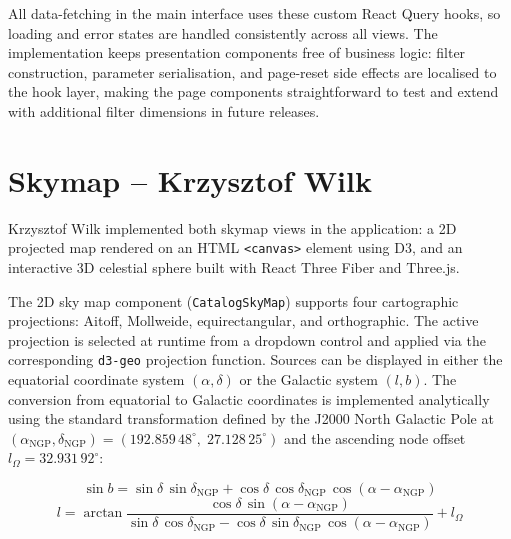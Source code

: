 \documentclass[11pt, a4paper]{article}
\begin{document}
All data-fetching in the main interface uses these custom React Query hooks, so loading and error states are handled consistently across all views.
The implementation keeps presentation components free of business logic: filter construction, parameter serialisation, and page-reset side effects are localised to the hook layer, making the page components straightforward to test and extend with additional filter dimensions in future releases.

\section{Skymap -- Krzysztof Wilk}

Krzysztof Wilk implemented both skymap views in the application: a 2D projected map rendered on an HTML \texttt{<canvas>} element using D3, and an interactive 3D celestial sphere built with React Three Fiber and Three.js.

The 2D sky map component (\texttt{CatalogSkyMap}) supports four cartographic projections: Aitoff, Mollweide, equirectangular, and orthographic.
The active projection is selected  at runtime from a dropdown control and applied via the corresponding \texttt{d3-geo} projection function.
Sources can be displayed in either the equatorial coordinate system $(\alpha, \delta)$ or the Galactic system $(l, b)$.
The conversion from equatorial to Galactic coordinates is implemented analytically using the standard transformation defined by the J2000 North Galactic Pole at $(\alpha_{\text{NGP}}, \delta_{\text{NGP}}) = (192.859\,48^{\circ},\; 27.128\,25^{\circ})$ and the ascending node offset $l_{\Omega} = 32.931\,92^{\circ}$:

\begin{equation}
    \sin b = \sin\delta\,\sin\delta_{\text{NGP}} + \cos\delta\,\cos\delta_{\text{NGP}}\,\cos(\alpha - \alpha_{\text{NGP}})
\end{equation}
\begin{equation}
    l = \arctan\!\frac{\cos\delta\,\sin(\alpha - \alpha_{\text{NGP}})}{\sin\delta\,\cos\delta_{\text{NGP}} - \cos\delta\,\sin\delta_{\text{NGP}}\,\cos(\alpha - \alpha_{\text{NGP}})} + l_{\Omega}
\end{equation}
\end{document}
